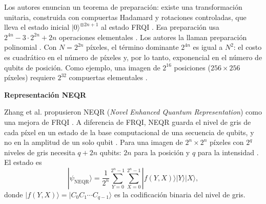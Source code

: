 Los autores enuncian un teorema de preparación: existe una transformación unitaria, construida con compuertas Hadamard y rotaciones controladas, que lleva el estado inicial $|0\rangle^{\otimes 2n+1}$ al estado FRQI \cite{Le2011FRQI}.
Esa preparación usa $2^{4n} - 3 \cdot 2^{2n} + 2n$ operaciones elementales \cite{Le2011FRQI}.
Los autores la llaman preparación polinomial \cite{Le2011FRQI}. Con $N = 2^{2n}$ píxeles, el término dominante $2^{4n}$ es igual a $N^2$: el costo es cuadrático en el número de píxeles y, por lo tanto, exponencial en el número de qubits de posición.
Como ejemplo, una imagen de $2^{16}$ posiciones ($256 \times 256$ píxeles) requiere $2^{32}$ compuertas elementales \cite{Le2011FRQI}.

\textbf{Representación NEQR}

Zhang et al. propusieron NEQR (\textit{Novel Enhanced Quantum Representation}) como una mejora de FRQI \cite{Zhang2013NEQR}.
A diferencia de FRQI, NEQR guarda el nivel de gris de cada píxel en un estado de la base computacional de una secuencia de qubits, y no en la amplitud de un solo qubit \cite{Zhang2013NEQR}.
Para una imagen de $2^n \times 2^n$ píxeles con $2^q$ niveles de gris necesita $q + 2n$ qubits: $2n$ para la posición y $q$ para la intensidad \cite{Zhang2013NEQR}. El estado es
\begin{equation}
  |\psi_{\text{NEQR}}\rangle = \frac{1}{2^n} \sum_{Y=0}^{2^n-1} \sum_{X=0}^{2^n-1} |f(Y, X)\rangle |Y\rangle |X\rangle,
\end{equation}
donde $|f(Y, X)\rangle = |C_0 C_1 \cdots C_{q-1}\rangle$ es la codificación binaria del nivel de gris.

